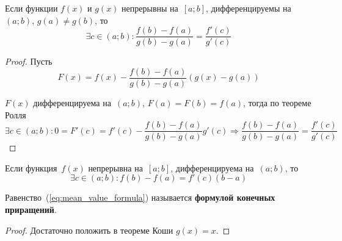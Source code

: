  
\begin{theorem}
\label{th:Cauchy's_mean_value}
Если функции $f(x)$ и $g(x)$ непрерывны на~$[a; b]$, дифференцируемы на~$(a; b)$, $g(a) \neq g(b)$, то
\begin{equation*}
\exists c \in (a; b) \colon \frac{f(b) - f(a)}{g(b) - g(a)} = \frac{f'(c)}{g'(c)}
\end{equation*}
\end{theorem}
\begin{proof}
Пусть
\begin{equation*}
F(x) = f(x) - \frac{f(b) - f(a)}{g(b) - g(a)}(g(x) - g(a))
\end{equation*}

$F(x)$ дифференцируема на~$(a; b)$, $F(a) = F(b) = f(a)$, тогда по теореме Ролля
\begin{equation*}
\exists c \in (a; b) \colon 0 = F'(c) = f'(c) - \frac{f(b) - f(a)}{g(b) - g(a)} g'(c) \Rightarrow
\frac{f(b) - f(a)}{g(b) - g(a)} = \frac{f'(c)}{g'(c)}
\end{equation*}
\end{proof}

\begin{theorem}
\label{th:mean_value}
Если функция~$f(x)$ непрерывна на~$[a; b]$, дифференцируема на~$(a; b)$, то
\begin{equation}
\label{eq:mean_value_formula}
\exists c \in (a; b) \colon f(b) - f(a) = f'(c)(b - a)
\end{equation}
\end{theorem}

\begin{center}
\end{center}

 Равенство~(\ref*{eq:mean_value_formula}) называется \textbf{формулой конечных приращений}.
\begin{proof}
Достаточно положить в теореме Коши $g(x) = x$.
\end{proof}

